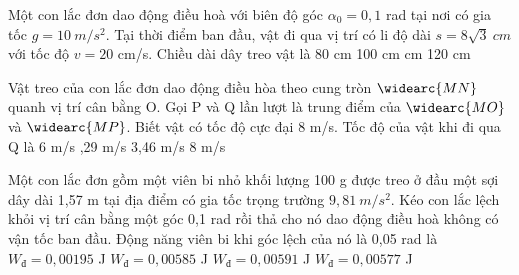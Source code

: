\begin{ex}%
Một con lắc đơn dao động điều hoà với biên độ góc $\alpha_0 = 0,1$ rad tại nơi có gia tốc $g = 10\ m/s^2$. Tại thời điểm ban đầu, vật đi qua vị trí có li độ dài $s=8\sqrt{3}\ cm$ với tốc độ $v = 20$ cm/s. Chiều dài dây treo vật là
\choice
{80 cm}
{100 cm}
{ cm}
{120 cm}
\end{ex} 

\begin{ex}%
Vật treo của con lắc đơn dao động điều hòa theo cung tròn $\widearc{MN}$ quanh vị trí cân bằng O. Gọi P và Q lần lượt là trung điểm của $\widearc{MO}$ và $\widearc{MP}$. Biết vật có tốc độ cực đại 8 m/s. Tốc độ của vật khi đi qua Q là
\choice
{6 m/s}
{,29 m/s}
{3,46 m/s}
{8 m/s}
\end{ex} 
\begin{ex}%
Một con lắc đơn gồm một viên bi nhỏ khối lượng 100 g được treo ở đầu một sợi dây dài 1,57 m tại địa điểm có gia tốc trọng trường $9,81\ m/s^2$. Kéo con lắc lệch khỏi vị trí cân bằng một góc 0,1 rad rồi thả cho nó dao động điều hoà không có vận tốc ban đầu. Động năng viên bi khi góc lệch của nó là 0,05 rad là
\choice
{$W_{\text{đ}} = 0,00195$ J}
{$W_{\text{đ}} = 0,00585$ J}
{$W_{\text{đ}} = 0,00591$ J}
{\True $W_{\text{đ}} = 0,00577$ J}
\end{ex} 


